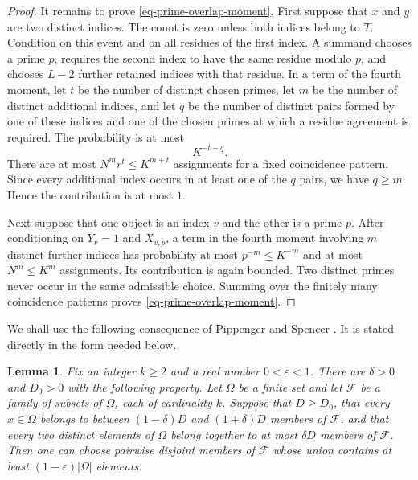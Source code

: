 \documentclass[11pt,reqno]{amsart}
\numberwithin{equation}{section}
\newtheorem{lemma}[theorem]{Lemma}
\begin{document}
\begin{proof}
It remains to prove \eqref{eq-prime-overlap-moment}. First suppose that $x$ and $y$ are two distinct indices. The count is zero unless both indices belong to $T$. Condition on this event and on all residues of the first index. A summand chooses a prime $p$, requires the second index to have the same residue modulo $p$, and chooses $L-2$ further retained indices with that residue. In a term of the fourth moment, let $t$ be the number of distinct chosen primes, let $m$ be the number of distinct additional indices, and let $q$ be the number of distinct pairs formed by one of these indices and one of the chosen primes at which a residue agreement is required. The probability is at most
\[
 K^{-t-q}.
\]
There are at most $N^m r^t\le K^{m+t}$ assignments for a fixed coincidence pattern. Since every additional index occurs in at least one of the $q$ pairs, we have $q\ge m$. Hence the contribution is at most $1$.

Next suppose that one object is an index $v$ and the other is a prime $p$. After conditioning on $Y_v=1$ and $X_{v,p}$, a term in the fourth moment involving $m$ distinct further indices has probability at most $p^{-m}\le K^{-m}$ and at most $N^m\le K^m$ assignments. Its contribution is again bounded. Two distinct primes never occur in the same admissible choice. Summing over the finitely many coincidence patterns proves \eqref{eq-prime-overlap-moment}.
\end{proof}

We shall use the following consequence of Pippenger and Spencer \cite{PippengerSpencer}. It is stated directly in the form needed below.

\begin{lemma}\label{lem-prime-disjoint-selection}
Fix an integer $k\ge2$ and a real number $0<\varepsilon<1$. There are $\delta>0$ and $D_0>0$ with the following property. Let $\Omega$ be a finite set and let $\mathcal F$ be a family of subsets of $\Omega$, each of cardinality $k$. Suppose that $D\ge D_0$, that every $x\in\Omega$ belongs to between $(1-\delta)D$ and $(1+\delta)D$ members of $\mathcal F$, and that every two distinct elements of $\Omega$ belong together to at most $\delta D$ members of $\mathcal F$. Then one can choose pairwise disjoint members of $\mathcal F$ whose union contains at least $(1-\varepsilon)|\Omega|$ elements.
\end{lemma}
\end{document}
